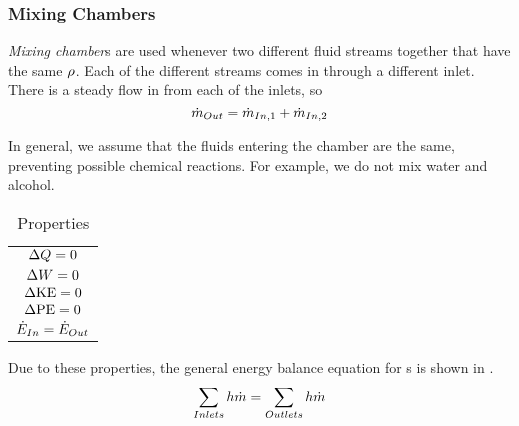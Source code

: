 \subsubsection{Mixing Chambers}\label{subsubsec:Mixing_Chambers}
\begin{definition}\label{def:Mixing_Chamber}
  \emph{Mixing chamber}s are used whenever two different fluid streams together that have the same $\rho$.
  Each of the different streams comes in through a different inlet.
  There is a steady flow in from each of the inlets, so
  \begin{equation*}
    \dot{m}_{Out} = \dot{m}_{In, 1} + \dot{m}_{In, 2}
  \end{equation*}

  In general, we assume that the fluids entering the chamber are the same, preventing possible chemical reactions.
  For example, we do not mix water and alcohol.
\end{definition}

\begin{table}[h!tbp]
  \centering
  \begin{tabular}{c}
    \toprule
    \nameref{def:Mixing_Chamber} \\
    \midrule
    $\Delta Q = 0$ \\
    $\Delta W = 0$ \\
    $\Delta \mathrm{KE} = 0$ \\
    $\Delta \mathrm{PE} = 0$ \\
    $\dot{E}_{In} = \dot{E}_{Out}$ \\
    \bottomrule
  \end{tabular}
  \caption{ Properties}
  \label{tab:Mixing_Chamber_Properties}
\end{table}

Due to these properties, the general energy balance equation for s is shown in .
\begin{equation}\label{eq:Mixing_Chamber}
  \sum\limits_{Inlets} h \dot{m} = \sum\limits_{Outlets} h \dot{m}
\end{equation}

